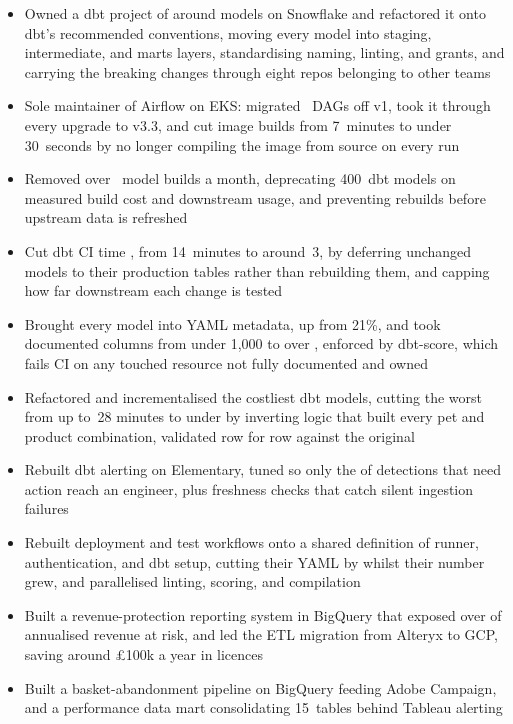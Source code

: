 \documentclass[10pt,a4paper,withhyper,ragged2e]{altacv}
\begin{document}
\begin{itemize}
  \item Owned a dbt project of around  models on Snowflake and refactored it onto
        dbt's recommended conventions, moving every model into staging, intermediate, and marts
        layers, standardising naming, linting, and grants, and carrying the breaking changes
        through eight repos belonging to other teams
  \item Sole maintainer of Airflow on EKS: migrated ~DAGs off v1, took it through
        every upgrade to v3.3, and cut image builds from 7~minutes to under 30~seconds by no longer
        compiling the image from source on every run
  \item Removed over ~model builds a month, deprecating 400~dbt models on
        measured build cost and downstream usage, and preventing rebuilds before upstream data is
        refreshed
  \item Cut dbt CI time , from 14~minutes to around~3, by deferring unchanged models
        to their production tables rather than rebuilding them, and capping how far downstream each
        change is tested
  \item Brought every model into YAML metadata, up from 21\%, and took documented columns from
        under 1,000 to over , enforced by dbt-score, which fails CI on any touched
        resource not fully documented and owned
  \item Refactored and incrementalised the costliest dbt models, cutting the worst from up to~28
        minutes to under  by inverting logic that built every pet and product
        combination, validated row for row against the original
  \item Rebuilt dbt alerting on Elementary, tuned so only the  of detections that
        need action reach an engineer, plus freshness checks that catch silent ingestion failures
  \item Rebuilt deployment and test workflows onto a shared definition of runner, authentication,
        and dbt setup, cutting their YAML by  whilst their number grew, and
        parallelised linting, scoring, and compilation
\end{itemize}

\begin{itemize}
  \item Built a revenue-protection reporting system in BigQuery that exposed over 
        of annualised revenue at risk, and led the ETL migration from Alteryx to GCP, saving around
        £100k a year in licences
  \item Built a basket-abandonment pipeline on BigQuery feeding Adobe Campaign, and a performance
        data mart consolidating 15~tables behind Tableau alerting
\end{itemize}
\end{document}
